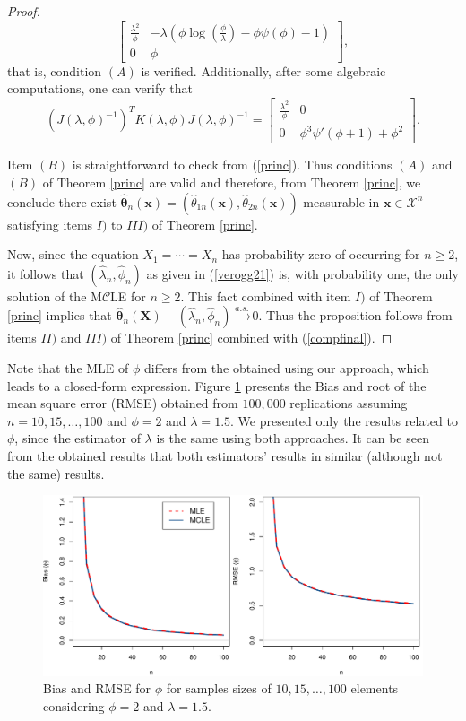 \documentclass[10pt,a4paper,onecolumn]{article} %
\newcommand{\bs}{\boldsymbol}
\begin{document}
\begin{proof}
\begin{equation*}
\begin{bmatrix}
\frac{\lambda^2}{\phi}   & -\lambda \left(\phi \log\left(\frac{\phi}{\lambda}\right) - \phi\psi(\phi) - 1\right)\\
0 &  \phi
\end{bmatrix},
\end{equation*}
that is, condition $(A)$ is verified. Additionally, after some algebraic computations, one can verify that
\begin{equation}\label{compfinal} (J(\lambda,\phi)^{-1})^T K(\lambda,\phi)J(\lambda,\phi)^{-1}= \begin{bmatrix}
\frac{\lambda^2}{\phi}   & 0\\
0 &  \phi^3 \psi'(\phi+1) + \phi^2
\end{bmatrix}.
\end{equation}

Item $(B)$ is straightforward to check from (\ref{princ}). Thus conditions $(A)$ and $(B)$ of Theorem \ref{princ} are valid and therefore, from Theorem \ref{princ}, we conclude there exist $\bs{\hat{\theta}}_n(\bs{x})=(\hat{\theta}_{1n}(\bs{x}),\hat{\theta}_{2n}(\bs{x}))$ measurable in $\bs{x}\in \mathcal{X}^n$ satisfying items $I)$ to $III)$ of Theorem \ref{princ}.

 Now, since the equation $X_1=\cdots=X_n$ has probability zero of occurring for $n\geq 2$, it follows that $(\hat\lambda_n,\hat\phi_n)$ as given in (\ref{verogg21}) is, with probability one, the only solution of the M$\mathcal{C}$LE for $n\geq 2$.
This fact combined with item $I)$ of Theorem \ref{princ} implies that $\bs{\hat{\theta}}_n(\bs{X})-(\hat\lambda_n,\hat\phi_n)\overset{a.s.}{\to} 0$. Thus the proposition follows from items $II)$ and $III)$ of Theorem \ref{princ}  combined with (\ref{compfinal}).
\end{proof}

Note that the MLE of $\phi$ differs from the obtained using our approach, which leads to a closed-form expression. Figure \ref{fg1} presents the Bias and root of the mean square error (RMSE) obtained from $100,000$ replications assuming $n=10,15,\ldots,100$ and $\phi=2$ and $\lambda=1.5$. We presented only the results related to $\phi$, since the estimator of $\lambda$ is the same using both approaches. It can be seen from the obtained results that both estimators' results in similar (although not the same) results.
\begin{figure}[!ht]
\centering
\includegraphics[scale=0.55]{biasgamma.pdf}	
\caption{Bias and RMSE for $\phi$ for samples sizes of $10,15,\ldots,100$ elements considering $\phi=2$ and $\lambda=1.5$.}\label{fg1}
\end{figure}
\end{document}
